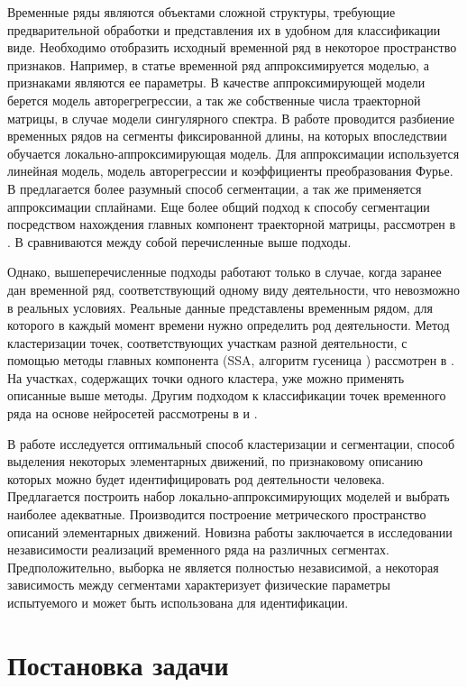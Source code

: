 \documentclass[12pt, twoside]{article}
\begin{document}
Временные ряды являются объектами сложной структуры, требующие предварительной обработки и представления их в удобном для классификации виде. Необходимо отобразить исходный временной ряд в некоторое пространство признаков. Например, в статье \cite{Ivkin15} временной ряд аппроксимируется моделью, а признаками являются ее параметры. В качестве аппроксимирующей модели берется модель авторегрегрессии, а так же собственные числа траекторной матрицы, в случае модели сингулярного спектра. В работе \cite{Karasikov16} проводится разбиение временных рядов на сегменты фиксированной длины, на которых впоследствии обучается локально-аппроксимирующая модель. Для аппроксимации используется линейная модель, модель авторегрессии и коэффициенты преобразования Фурье. В \cite{Anikeev18} предлагается более разумный способ сегментации, а так же применяется аппроксимации сплайнами. Еще более общий подход к способу сегментации посредством нахождения главных компонент траекторной матрицы, рассмотрен в \cite{Motrenko16}. В \cite{Bochkarev18} сравниваются между собой перечисленные выше подходы.

Однако, вышеперечисленные подходы работают только в случае, когда заранее дан временной ряд, соответствующий одному виду деятельности, что невозможно в реальных условиях. Реальные данные представлены временным рядом, для которого в каждый момент времени нужно определить род деятельности. Метод кластеризации точек, соответствующих участкам разной деятельности, с помощью методы главных компонента (SSA, алгоритм гусеница \cite{Danilov97}) рассмотрен в \cite{Grabovoy20}. На участках, содержащих точки одного кластера, уже можно применять описанные выше методы. Другим подходом к классификации точек временного ряда на основе нейросетей рассмотрены в \cite{Dafne19} и \cite{Cinar18}.

В работе исследуется оптимальный способ кластеризации и сегментации, способ выделения некоторых элементарных движений, по признаковому описанию которых можно будет идентифицировать род деятельности человека. Предлагается построить набор локально-аппроксимирующих моделей и выбрать наиболее адекватные. Производится построение метрического пространство описаний элементарных движений. Новизна работы заключается в исследовании независимости реализаций временного ряда на различных сегментах. Предположительно, выборка не является полностью независимой, а некоторая зависимость между сегментами характеризует физические параметры испытуемого и может быть использована для идентификации. 

\section{Постановка задачи}
\end{document}
